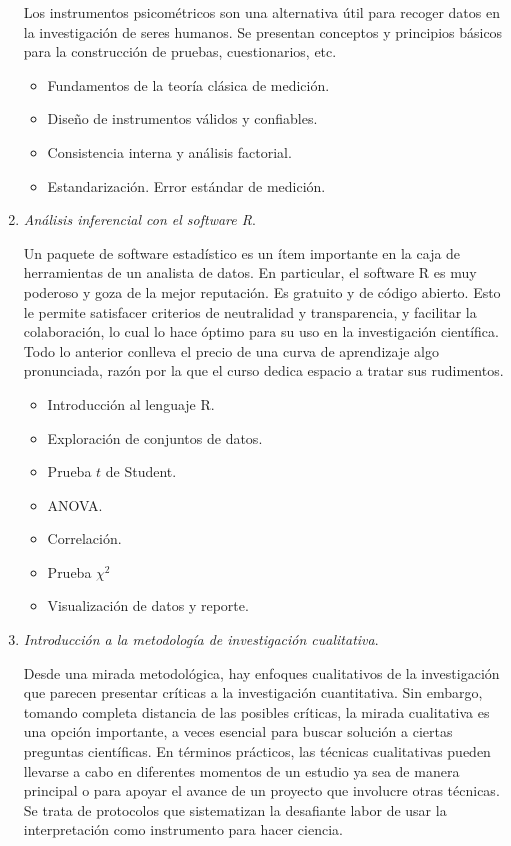 \documentclass[letterpaper,11pt]{article}
\begin{document}
\begin{enumerate}
  Los instrumentos psicométricos son una alternativa útil para recoger datos en la investigación de seres humanos. Se presentan conceptos y principios básicos para la construcción de pruebas, cuestionarios, etc.   

  \begin{itemize}
    \item Fundamentos de la teoría clásica de medición.
    \item Diseño de instrumentos válidos y confiables.
    \item Consistencia interna y análisis factorial.
    \item Estandarización. Error estándar de medición.
  \end{itemize}

\item \emph{Análisis inferencial con el software R}.\label{it:r}

Un paquete de software estadístico es un ítem importante en la caja de herramientas de un analista de datos. En particular, el software R es muy poderoso y goza de la mejor reputación. Es gratuito y de código abierto. Esto le permite satisfacer criterios de neutralidad y transparencia, y facilitar la colaboración, lo cual lo hace óptimo para su uso en la investigación científica. Todo lo anterior conlleva el precio de una curva de aprendizaje algo pronunciada, razón por la que el curso dedica espacio a tratar sus rudimentos.

  \begin{itemize}
    \item Introducción al lenguaje R.
    \item Exploración de conjuntos de datos.
    \item Prueba $t$ de Student.
    \item ANOVA.
    \item Correlación.
    \item Prueba $\chi^2$
    \item Visualización de datos y reporte.
  \end{itemize}
  
  
  \item \emph{Introducción a la metodología de investigación cualitativa}.

    Desde una mirada metodológica, hay enfoques cualitativos de la investigación que parecen presentar críticas a la investigación cuantitativa. Sin embargo, tomando completa distancia de las posibles críticas, la mirada cualitativa es una opción importante, a veces esencial para buscar solución a ciertas preguntas científicas. En términos prácticos, las técnicas cualitativas pueden llevarse a cabo en diferentes momentos de un estudio ya sea de manera principal o para apoyar el avance de un proyecto que involucre otras técnicas. Se trata de protocolos que sistematizan la desafiante labor de usar la interpretación como instrumento para hacer ciencia.
      

\end{enumerate}
\end{document}
